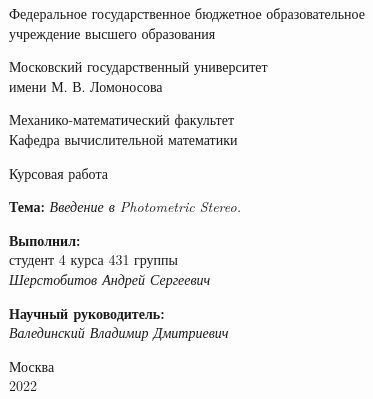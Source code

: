 \begin{titlepage}
  \begin{center}
    \large{Федеральное государственное бюджетное образовательное\\
      учреждение высшего образования\\}

    Московский государственный университет\\
    имени М. В. Ломоносова\\

    \vspace{0.25 cm}

    \normalsize{Механико-математический факультет\\}
    \vspace{0.5 cm}
    Кафедра вычислительной математики\\
  \end{center}

  \vspace{3cm}

  \begin{center}
    \LARGE{Курсовая работа}\\

    \vspace{0.5 cm}

    \normalsize{}
    \textbf{Тема:} \textit{Введение в Photometric Stereo.}
  \end{center}

  \vspace{3 cm}

  \begin{flushright}
    \textbf{Выполнил:}\\
    студент 4 курса
    431 группы\\

    \textit{Шерстобитов Андрей Сергеевич}\\

    \vspace{1 cm}

    \textbf{Научный руководитель:}\\

    \textit{Валединский Владимир Дмитриевич}
  \end{flushright}

  \vspace{\fill}
  \normalsize{}
  \begin{center}
    Москва\\2022
  \end{center}

  \thispagestyle{empty}
\end{titlepage}
